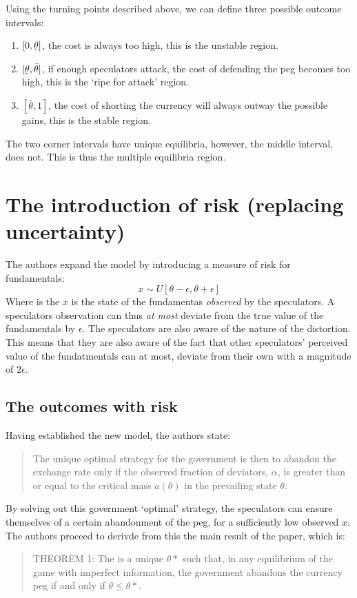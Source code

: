 \begin{refsection}
Using the turning points described above, we can define three possible outcome intervals:
\begin{enumerate}
	\item $[0, \underaccent{\bar}{\theta}]$, the cost is always too high, this is the unstable region.
	\item $[\underaccent{\bar}{\theta}, \bar{\theta}]$, if enough speculators attack, the cost of defending the peg becomes too high,
	this is the `ripe for attack' region.
	\item $[\bar{\theta}, 1]$, the cost of shorting the currency will always outway the possible gains,
	this is the stable region.
\end{enumerate}
The two corner intervals have unique equilibria, however, the middle interval, does not. This is thus the multiple equilibria region.


\section{The introduction of risk (replacing uncertainty)}
The authors expand the model by introducing a measure of risk for fundamentals:
\begin{equation}
x \sim U[\theta - \epsilon, \theta + \epsilon]
\end{equation}
Where is the $x$ is the state of the fundamentas \textit{observed} by the speculators.
A speculators observation can thus \textit{at most} deviate from the true value of the fundamentals by $\epsilon$.
The speculators are also aware of the nature of the distortion.
This means that they are also aware of the fact that other speculators' perceived value of the fundatmentals can at most,
deviate from their own with a magnitude of $2\epsilon$.

\subsection{The outcomes with risk}
\label{unc:results}
Having established the new model, the authors state:
\begin{quotation}
	The unique optimal strategy for the government is then to abandon the exchange rate only if the observed fraction of deviators, $\alpha$, is greater than or equal to the critical mass $a(\theta)$ in the prevailing state $\theta$.\parencite[p.~591]{morris1998unique}
\end{quotation}
By solving out this government `optimal' strategy,
the speculators can ensure themselves of a certain abandonment of the peg,
for a sufficiently low observed $x$.
The authors proceed to derivde from this the main result of the paper, which is:
\begin{quotation}
	THEOREM 1: The is a unique $\theta *$ such that,
	in any equilibrium of the game with imperfect information,
	the government abandons the currency peg if and only if $\theta \leq \theta *$. \parencite[p.~592]{morris1998unique}
\end{quotation}



\end{refsection}
